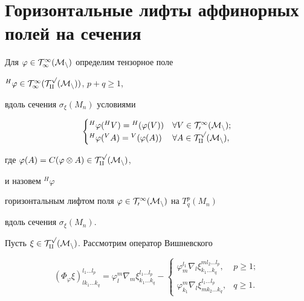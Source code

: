 \section{Горизонтальные лифты аффинорных полей на сечения}





Для $\varphi \in \cal T^1_1(M_n)$ определим тензорное поле 


${}^H\varphi \in \cal T^1_1(T^p_q(M_n))$, $p+q \ge 1$,


вдоль сечения $\sigma_\xi(M_n)$ условиями


$$


\begin{cases} 


{}^H\varphi({}^HV) = {}^H(\varphi(V)) & \forall V \in \cT^1_0(M_n);\\


{}^H\varphi({}^VA) = {}^V(\varphi(A)) & \forall A \in \cT^p_q(M_n),


\end{cases}


$$


где $\varphi(A) = C(\varphi \otimes A) \in \cal T^p_q(M_n)$,


и назовем ${}^H\varphi$ 


горизонтальным лифтом поля $\varphi \in \cal T^1_0(M_n)$ на $T^p_q(M_n)$ 


вдоль сечения $\sigma_\xi(M_n)$.





Пусть $\xi \in \cal T^p_q(M_n)$. Рассмотрим оператор Вишневского 


$$


(\Phi_\varphi \xi)_{l k_1 \dotsc k_q}^{l_1 \dotsc l_p} =


\varphi^m_l \nabla_m \xi_{k_1 \dotsc k_q}^{l_1 \dotsc l_p} -


\begin{cases}


\varphi^{l_1}_m \nabla_l \xi_{k_1 \dotsc k_q}^{m l_2 \dotsc l_p}, &


p \ge 1; \\


\varphi_{k_1}^m \nabla_l \xi_{m k_2 \dotsc k_q}^{ l_1 \dotsc l_p}, &


q \ge 1.


\end{cases}


$$





